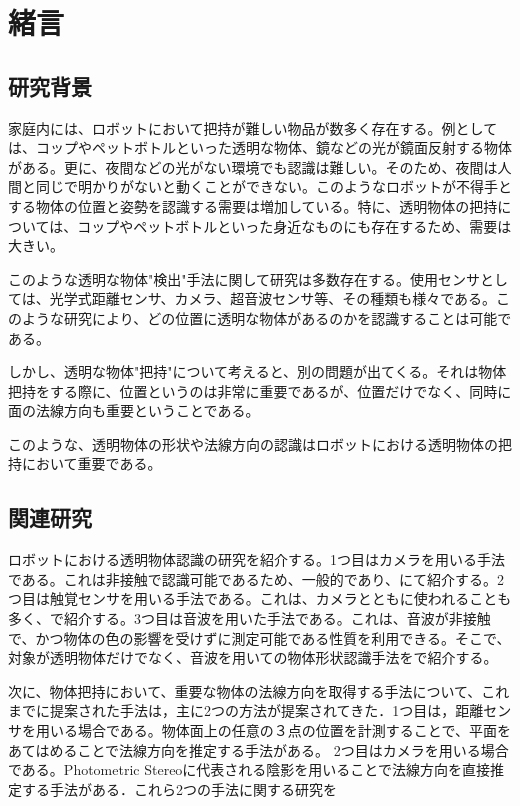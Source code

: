 \section{緒言}
\label{chap:introduction}

\subsection{研究背景}
\label{sec:back_ground}
家庭内には、ロボットにおいて把持が難しい物品が数多く存在する。例としては、コップやペットボトルといった透明な物体、鏡などの光が鏡面反射する物体がある。更に、夜間などの光がない環境でも認識は難しい。そのため、夜間は人間と同じで明かりがないと動くことができない。このようなロボットが不得手とする物体の位置と姿勢を認識する需要は増加している。特に、透明物体の把持については、コップやペットボトルといった身近なものにも存在するため、需要は大きい。

このような透明な物体"検出"手法に関して研究は多数存在する。使用センサとしては、光学式距離センサ\cite{url_omron}、カメラ\cite{Yichao2016transparentdetect}、超音波センサ\cite{ugajin2012ultrasoundobject}等、その種類も様々である。このような研究により、どの位置に透明な物体があるのかを認識することは可能である。

しかし、透明な物体"把持"について考えると、別の問題が出てくる。それは物体把持をする際に、位置というのは非常に重要であるが、位置だけでなく、同時に面の法線方向も重要ということである。\cite{wan2018manipulationsurfacenormal}

このような、透明物体の形状や法線方向の認識はロボットにおける透明物体の把持において重要である。

\subsection{関連研究}
\label{sec:related_works}
ロボットにおける透明物体認識の研究を紹介する。1つ目はカメラを用いる手法である。これは非接触で認識可能であるため、一般的であり、にて紹介する。2つ目は触覚センサを用いる手法である。これは、カメラとともに使われることも多く、で紹介する。3つ目は音波を用いた手法である。これは、音波が非接触で、かつ物体の色の影響を受けずに測定可能である性質を利用できる。そこで、対象が透明物体だけでなく、音波を用いての物体形状認識手法をで紹介する。

次に、物体把持において、重要な物体の法線方向を取得する手法について、これまでに提案された手法は，主に2つの方法が提案されてきた．1つ目は，距離センサを用いる場合である。物体面上の任意の３点の位置を計測することで、平面をあてはめることで法線方向を推定する手法がある。
2つ目はカメラを用いる場合である。Photometric Stereoに代表される陰影を用いることで法線方向を直接推定する手法がある．これら2つの手法に関する研究を

